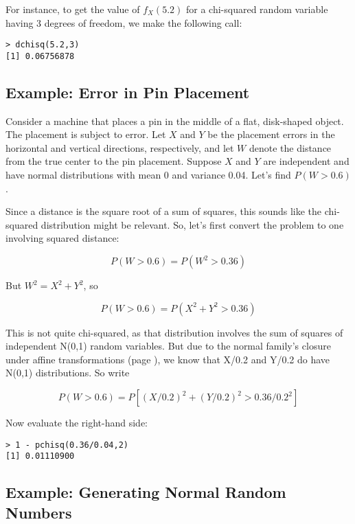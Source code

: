 For instance, to get the value of $f_X(5.2)$ for a chi-squared random
variable having 3 degrees of freedom, we make the following call:

\begin{lstlisting}
> dchisq(5.2,3)
[1] 0.06756878
\end{lstlisting}

\subsection{Example:  Error in Pin Placement}

Consider a machine that places a pin in the middle of a flat,
disk-shaped object. The placement is subject to error. Let $X$ and $Y$ be
the placement errors in the horizontal and vertical directions,
respectively, and let $W$ denote the distance from the true center to the
pin placement. Suppose $X$ and $Y$ are independent and have normal
distributions with mean 0 and variance 0.04. Let's find $P(W > 0.6)$. 

Since a distance is the square root of a sum of squares, this sounds
like the chi-squared distribution might be relevant.  So, let's first
convert the problem to one involving squared distance:

\begin{equation}
P(W > 0.6) = P(W^2 > 0.36)
\end{equation}

But $W^2 = X^2 + Y^2$, so

\begin{equation}
P(W > 0.6) = P(X^2 + Y^2 > 0.36)
\end{equation}

This is not quite chi-squared, as that distribution involves the sum of
squares of independent N(0,1) random variables.  But due to the normal
family's closure under affine transformations (page \pageref{affine}),
we know that X/0.2 and Y/0.2 do have N(0,1) distributions.  So write

\begin{equation}
P(W > 0.6) = P[(X/0.2)^2 + (Y/0.2)^2 > 0.36/0.2^2]
\end{equation}

Now evaluate the right-hand side:

\begin{lstlisting}
> 1 - pchisq(0.36/0.04,2)
[1] 0.01110900
\end{lstlisting}

\subsection{Example:  Generating Normal Random Numbers}

